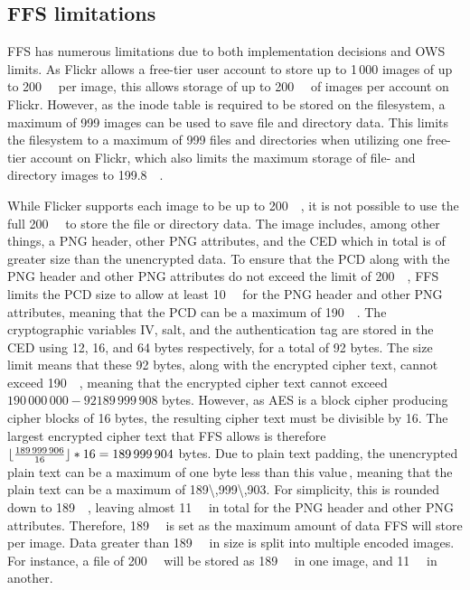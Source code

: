 \subsection{FFS limitations}
\label{subsec:ffs_limits}
\gls{FFS} has numerous limitations due to both implementation decisions and \gls{OWS} limits. As Flickr allows a \mbox{free-tier} user account to store up to 1\,000 images of up to \SI{200}{\mega\byte} per image, this allows storage of up to \SI{200}{\giga\byte} of images per account on Flickr. However, as the inode table is required to be stored on the filesystem, a maximum of 999 images can be used to save file and directory data. This limits the filesystem to a maximum of 999 files and directories when utilizing one \mbox{free-tier} account on Flickr, which also limits the maximum storage of file- and directory images to \SI{199.8}{\giga\byte}.

While Flicker supports each image to be up to \SI{200}{\mega\byte}, it is not possible to use the full \SI{200}{\mega\byte} to store the file or directory data. The image includes, among other things, a PNG header, other PNG attributes, and the \gls{CED} which in total is of greater size than the unencrypted data. To ensure that the \gls{PCD} along with the PNG header and other PNG attributes do not exceed the limit of \SI{200}{\mega\byte}, \gls{FFS} limits the \gls{PCD} size to allow at least \SI{10}{\mega\byte} for the PNG header and other PNG attributes, meaning that the \gls{PCD} can be a maximum of \SI{190}{\mega\byte}. The cryptographic variables \gls{IV}, salt, and the authentication tag are stored in the \gls{CED} using 12, 16, and 64 bytes respectively, for a total of 92 bytes. The size limit means that these 92 bytes, along with the encrypted cipher text, cannot exceed \SI{190}{\mega\byte}, meaning that the encrypted cipher text cannot exceed $190\,000\,000 - 92 189\,999\,908$ bytes. However, as \gls{AES} is a block cipher producing cipher blocks of 16 bytes, the resulting cipher text must be divisible by 16. The largest encrypted cipher text that \gls{FFS} allows is therefore $\lfloor \frac{189\,999\,906}{16} \rfloor*16 = 189\,999\,904$ bytes. Due to plain text padding, the unencrypted plain text can be a maximum of one byte less than this value\,\cite{z.z.coderAnswerSizeData2010}, meaning that the plain text can be a maximum of \SI{189\,999\,903}{\byte}. For simplicity, this is rounded down to \SI{189}{\mega\byte}, leaving almost \SI{11}{\mega\byte} in total for the PNG header and other PNG attributes. Therefore, \SI{189}{\mega\byte} is set as the maximum amount of data \gls{FFS} will store per image. Data greater than \SI{189}{\mega\byte} in size is split into multiple encoded images. For instance, a file of \SI{200}{\mega\byte} will be stored as \SI{189}{\mega\byte} in one image, and \SI{11}{\mega\byte} in another. 

